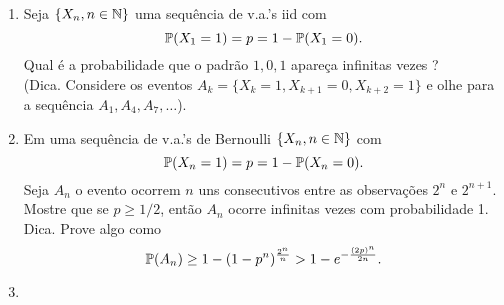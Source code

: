 \begin{enumerate}[leftmargin=*]
\item 
Seja $\{X_n, n\in\N\}$ uma sequência de v.a.'s iid com
	\[
		\P(X_1=1)=p=1-\P(X_1=0).
	\]
Qual é a probabilidade que o padrão $1,0,1$ apareça
infinitas vezes ? 
\\
(Dica. Considere os eventos $A_k=\{X_k=1,X_{k+1}=0,X_{k+2}=1\}$ e 
olhe para a sequência $A_1,A_4,A_7,\ldots$).



\item 
Em uma sequência de v.a.'s de Bernoulli $\{X_n, n\in\N\}$
com 
	\[
		\P(X_n=1)=p=1-\P(X_n=0).
	\]
Seja $A_n$ o evento ocorrem $n$ uns consecutivos entre as 
observações $2^n$ e $2^{n+1}$. Mostre que se $p \geq 1/2$,
então $A_n$ ocorre infinitas vezes com probabilidade 1.
\\
Dica. Prove algo como 
\[
	\P(A_n) \geq 
	1-(1-p^n)^{\frac{2^n}{n}}
	>
	1-e^{-\frac{(2p)^n}{2n}}.		
\]


\item 
 

\end{enumerate}